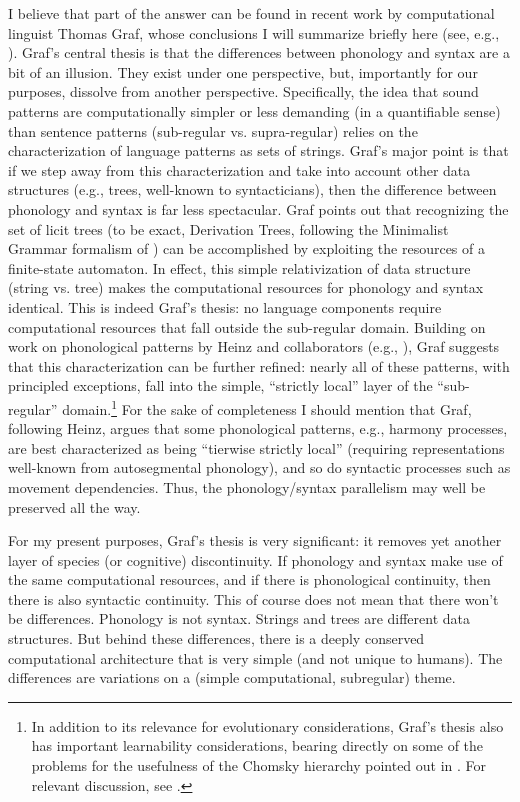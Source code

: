 I believe that part of the answer can be found in recent work by computational linguist Thomas Graf, whose conclusions I will summarize briefly here (see, e.g., \cite{graf2014dependencies,graf2015cognitive,graf2020curbing}). Graf's central thesis is that the differences between phonology and syntax are a bit of an illusion. They exist under one perspective, but, importantly for our purposes, dissolve from another perspective. Specifically, the idea that sound patterns are computationally simpler or less demanding (in a quantifiable sense) than sentence patterns (sub-regular vs. supra-regular) relies on the characterization of language patterns as sets of strings. Graf's major point is that if we step away from this characterization and take into account other data structures (e.g., trees, well-known to syntacticians), then the difference between phonology and syntax is far less spectacular. Graf points out that recognizing
the set of licit trees (to be exact, Derivation Trees, following the Minimalist Grammar formalism of \cite{stabler2011computational}) can be accomplished by exploiting the resources of a finite-state automaton. In effect, this simple relativization of data structure (string vs. tree) makes the computational resources for phonology and syntax identical. This is indeed Graf's thesis: 
no language components require computational resources that fall outside the sub-regular domain. Building on work on phonological patterns by Heinz and collaborators (e.g., \cite{heinz2018computational}), Graf suggests that this characterization can be further refined: nearly all of these patterns, with principled exceptions, fall into the simple, ``strictly local'' layer of the ``sub-regular'' domain.\footnote{In addition to its relevance for evolutionary considerations, Graf's thesis also has important learnability considerations, bearing directly on some of the problems for the usefulness of the Chomsky hierarchy pointed out in \cite{rogers2011aural}. For relevant discussion, see \cite{rawski}.} For the sake of completeness I should mention that Graf, following Heinz, argues
that some phonological patterns, e.g., harmony processes, are best characterized as being ``tierwise strictly local'' (requiring representations well-known from autosegmental phonology), and so do syntactic processes such as movement dependencies. Thus, the phonology/syntax parallelism may well be preserved all the way.

For my present purposes, Graf's thesis is very significant: it removes yet another layer of species (or cognitive) discontinuity. If phonology and syntax make use of the same computational resources, and if there is phonological continuity, then there is also syntactic continuity. This of course does not mean that there won't be differences. Phonology is not syntax. Strings and trees are different data structures. But behind these differences, there is a deeply conserved computational architecture that is very simple (and not unique to humans). The differences are variations on a (simple computational, subregular) theme. 

